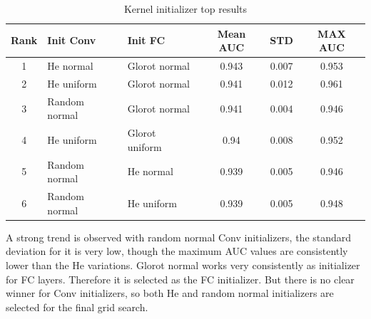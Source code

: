 \begin{center}
 \begin{table}
  \begin{tabular}{|c l l c c c|} 
   \hline\hline
   \rowcolor{lightgrey}
   Rank & Init Conv & Init FC & Mean AUC & STD & MAX AUC\\ [0.5ex] 
   \hline
   1 & He normal & Glorot normal & 0.943 & 0.007 & 0.953 \\ 
   \hline
   2 & He uniform & Glorot normal & 0.941 & 0.012 & 0.961 \\
   \hline
   3 & Random normal & Glorot normal & 0.941 & 0.004 & 0.946 \\
   \hline
   4 & He uniform & Glorot uniform & 0.94 & 0.008 & 0.952\\
   \hline
   5 & Random normal & He normal & 0.939 & 0.005 & 0.946\\
   \hline
   6 & Random normal & He uniform & 0.939 & 0.005 & 0.948\\
   \hline \hline
  \end{tabular}
 \caption{Kernel initializer top results}
 \label{table:kernel_init}
\end{table} 
\end{center}
A strong trend is observed with random normal Conv initializers, the standard deviation for it is very low, though the maximum AUC values are consistently lower than the He variations. Glorot normal works very consistently as initializer for 
FC layers. Therefore it is selected as the FC initializer. But there is no clear winner for Conv initializers, so both He and random normal initializers are selected for the final grid search. 

